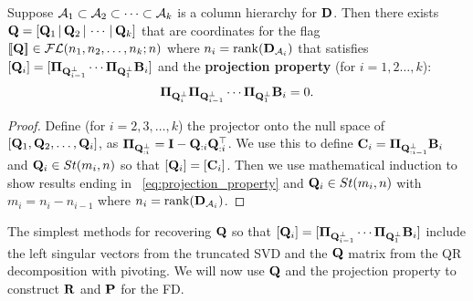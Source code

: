 \begin{prop}\label{prop:stiefel_coords}
    Suppose $\mathcal{A}_1 \subset \mathcal{A}_2 \subset \cdots \subset \mathcal{A}_k$ is a column hierarchy for $\mathbf{D}$. Then there exists $\mathbf{Q}= [\mathbf{Q}_1\,|\,\mathbf{Q}_2\,|\, \cdots\,|\,\mathbf{Q}_k]$ that are coordinates for the flag $[\![\mathbf{Q}]\!]\in\mathcal{FL}(n_1,n_2,\dots,n_k;n)$ where $n_i = \mathrm{rank}(\mathbf{D}_{\mathcal{A}_i})$ that satisfies $[\mathbf{Q}_i] = [\boldsymbol{\Pi}_{\mathbf{Q}_{i-1}^\perp}\cdots \boldsymbol{\Pi}_{\mathbf{Q}_1^\perp}\mathbf{B}_i]$ and the \textbf{projection property} (for $i=1,2\dots,k$): 
    \begin{equation}\label{eq:projection_property}
    \boldsymbol{\Pi}_{\mathbf{Q}_i^\perp}\boldsymbol{\Pi}_{\mathbf{Q}_{i-1}^\perp}\cdots \boldsymbol{\Pi}_{\mathbf{Q}_1^\perp} \mathbf{B}_i = 0.
    \end{equation}
\end{prop}
\begin{proof}
    Define (for $i=2,3,\dots,k$) the projector onto the null space of $[\mathbf{Q}_1,\mathbf{Q}_2,\dots,\mathbf{Q}_i]$, as $\boldsymbol{\Pi}_{\mathbf{Q}_{:i}^\perp} = \mathbf{I} - \mathbf{Q}_{:i}\mathbf{Q}_{:i}^\top$. We use this to define $\mathbf{C}_i = \boldsymbol{\Pi}_{\mathbf{Q}_{:i-1}^\perp}\mathbf{B}_i$ and $\mathbf{Q}_i \in St(m_i,n)$ so that $[\mathbf{Q}_i] = [\mathbf{C}_i]$. Then we use mathematical induction to show results ending in ~\cref{eq:projection_property} and $\mathbf{Q}_i \in St(m_i,n)$ with $m_i = n_i - n_{i-1}$ where $n_i = \mathrm{rank}(\mathbf{D}_{\mathcal{A}_i})$.
\end{proof}

The simplest methods for recovering $\mathbf{Q}$ so that $[\mathbf{Q}_i] = [\boldsymbol{\Pi}_{\mathbf{Q}_{i-1}^\perp}\cdots \boldsymbol{\Pi}_{\mathbf{Q}_1^\perp}\mathbf{B}_i]$ include the left singular vectors from the truncated SVD and the $\mathbf{Q}$ matrix from the QR decomposition with pivoting. We will now use $\mathbf{Q}$ and the projection property to construct $\mathbf{R}$ and $\mathbf{P}$ for the FD.



